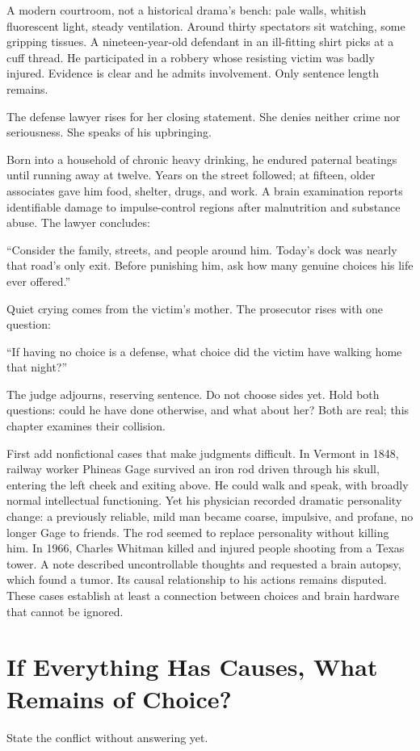 A modern courtroom, not a historical drama's bench: pale walls, whitish fluorescent light, steady ventilation. Around thirty spectators sit watching, some gripping tissues. A nineteen-year-old defendant in an ill-fitting shirt picks at a cuff thread. He participated in a robbery whose resisting victim was badly injured. Evidence is clear and he admits involvement. Only sentence length remains.

The defense lawyer rises for her closing statement. She denies neither crime nor seriousness. She speaks of his upbringing.

Born into a household of chronic heavy drinking, he endured paternal beatings until running away at twelve. Years on the street followed; at fifteen, older associates gave him food, shelter, drugs, and work. A brain examination reports identifiable damage to impulse-control regions after malnutrition and substance abuse. The lawyer concludes:

``Consider the family, streets, and people around him. Today's dock was nearly that road's only exit. Before punishing him, ask how many genuine choices his life ever offered.''

Quiet crying comes from the victim's mother. The prosecutor rises with one question:

``If having no choice is a defense, what choice did the victim have walking home that night?''

The judge adjourns, reserving sentence. Do not choose sides yet. Hold both questions: could he have done otherwise, and what about her? Both are real; this chapter examines their collision.

First add nonfictional cases that make judgments difficult. In Vermont in 1848, railway worker Phineas Gage survived an iron rod driven through his skull, entering the left cheek and exiting above. He could walk and speak, with broadly normal intellectual functioning. Yet his physician recorded dramatic personality change: a previously reliable, mild man became coarse, impulsive, and profane, no longer Gage to friends. The rod seemed to replace personality without killing him. In 1966, Charles Whitman killed and injured people shooting from a Texas tower. A note described uncontrollable thoughts and requested a brain autopsy, which found a tumor. Its causal relationship to his actions remains disputed. These cases establish at least a connection between choices and brain hardware that cannot be ignored.

\section[Causes and Choice]{If Everything Has Causes, What Remains of Choice?}
State the conflict without answering yet.

